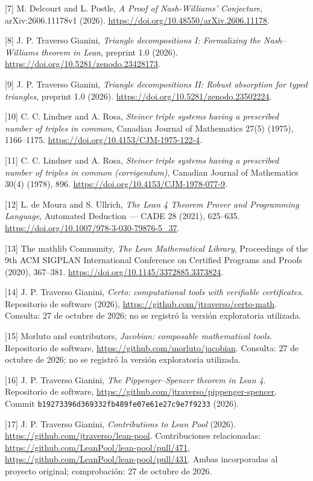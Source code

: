 \documentclass[spanish,11pt,a4paper]{article}
\begin{document}
{[}7{]} M. Delcourt and L. Postle, \emph{A Proof of Nash-Williams' Conjecture}, arXiv:2606.11178v1 (2026). \url{https://doi.org/10.48550/arXiv.2606.11178}.

{[}8{]} J. P. Traverso Gianini, \emph{Triangle decompositions I: Formalizing the Nash--Williams theorem in Lean}, preprint 1.0 (2026). \url{https://doi.org/10.5281/zenodo.23428173}.

{[}9{]} J. P. Traverso Gianini, \emph{Triangle decompositions II: Robust absorption for typed triangles}, preprint 1.0 (2026). \url{https://doi.org/10.5281/zenodo.23502224}.

{[}10{]} C. C. Lindner and A. Rosa, \emph{Steiner triple systems having a prescribed number of triples in common}, Canadian Journal of Mathematics 27(5) (1975), 1166--1175. \url{https://doi.org/10.4153/CJM-1975-122-4}.

{[}11{]} C. C. Lindner and A. Rosa, \emph{Steiner triple systems having a prescribed number of triples in common (corrigendum)}, Canadian Journal of Mathematics 30(4) (1978), 896. \url{https://doi.org/10.4153/CJM-1978-077-9}.

{[}12{]} L. de Moura and S. Ullrich, \emph{The Lean 4 Theorem Prover and Programming Language}, Automated Deduction --- CADE 28 (2021), 625--635. \url{https://doi.org/10.1007/978-3-030-79876-5_37}.

{[}13{]} The mathlib Community, \emph{The Lean Mathematical Library}, Proceedings of the 9th ACM SIGPLAN International Conference on Certified Programs and Proofs (2020), 367--381. \url{https://doi.org/10.1145/3372885.3373824}.

{[}14{]} J. P. Traverso Gianini, \emph{Certo: computational tools with verifiable certificates}. Repositorio de software (2026), \url{https://github.com/jtraverso/certo-math}. Consulta: 27 de octubre de 2026; no se registró la versión exploratoria utilizada.

{[}15{]} Morluto and contributors, \emph{Jacobian: composable mathematical tools}. Repositorio de software, \url{https://github.com/morluto/jacobian}. Consulta: 27 de octubre de 2026; no se registró la versión exploratoria utilizada.

{[}16{]} J. P. Traverso Gianini, \emph{The Pippenger--Spencer theorem in Lean 4}. Repositorio de software, \url{https://github.com/jtraverso/pippenger-spencer}. Commit \texttt{b1927339\allowbreak{}6d369332\allowbreak{}fb489fe0\allowbreak{}7e61e27c\allowbreak{}9e7f9233} (2026).

{[}17{]} J. P. Traverso Gianini, \emph{Contributions to Lean Pool} (2026). \url{https://github.com/jtraverso/lean-pool}. Contribuciones relacionadas: \url{https://github.com/LeanPool/lean-pool/pull/471}, \url{https://github.com/LeanPool/lean-pool/pull/431}. Ambas incorporadas al proyecto original; comprobación: 27 de octubre de 2026.
\end{document}
